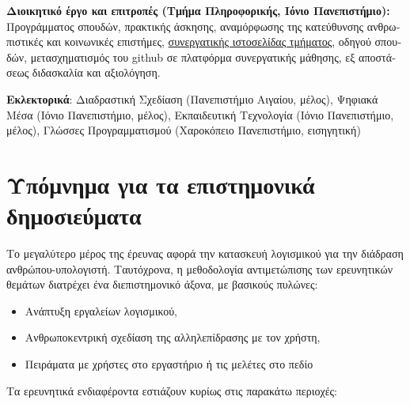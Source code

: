 \documentclass[11pt, a4paper]{article}
\begin{document}
\begin{greek}
\textbf{Διοικητικό έργο και επιτροπές (Τμήμα Πληροφορικής, Ιόνιο
Πανεπιστήμιο):} Προγράμματος σπουδών, πρακτικής άσκησης, αναμόρφωσης της
κατεύθυνσης ανθρωπιστικές και κοινωνικές επιστήμες,
\href{https://github.com/ioniodi/sitegr}{συνεργατικής ιστοσελίδας
τμήματος}, οδηγού σπουδών, μετασχηματισμός του github σε πλατφόρμα
συνεργατικής μάθησης, εξ αποστάσεως διδασκαλία και αξιολόγηση.

\textbf{Εκλεκτορικά}: Διαδραστική Σχεδίαση (Πανεπιστήμιο Αιγαίου,
μέλος), Ψηφιακά Μέσα (Ιόνιο Πανεπιστήμιο, μέλος), Εκπαιδευτική
Τεχνολογία (Ιόνιο Πανεπιστήμιο, μέλος), Γλώσσες Προγραμματισμού
(Χαροκόπειο Πανεπιστήμιο, εισηγητική)

\hypertarget{ux3c5ux3c0ux3ccux3bcux3bdux3b7ux3bcux3b1-ux3b3ux3b9ux3b1-ux3c4ux3b1-ux3b5ux3c0ux3b9ux3c3ux3c4ux3b7ux3bcux3bfux3bdux3b9ux3baux3ac-ux3b4ux3b7ux3bcux3bfux3c3ux3b9ux3b5ux3cdux3bcux3b1ux3c4ux3b1}{%
\section{Υπόμνημα για τα επιστημονικά
δημοσιεύματα}\label{ux3c5ux3c0ux3ccux3bcux3bdux3b7ux3bcux3b1-ux3b3ux3b9ux3b1-ux3c4ux3b1-ux3b5ux3c0ux3b9ux3c3ux3c4ux3b7ux3bcux3bfux3bdux3b9ux3baux3ac-ux3b4ux3b7ux3bcux3bfux3c3ux3b9ux3b5ux3cdux3bcux3b1ux3c4ux3b1}}

Το μεγαλύτερο μέρος της έρευνας αφορά την κατασκευή λογισμικού για την
διάδραση ανθρώπου-υπολογιστή. Ταυτόχρονα, η μεθοδολογία αντιμετώπισης
των ερευνητικών θεμάτων διατρέχει ένα διεπιστημονικό άξονα, με βασικούς
πυλώνες:

\begin{itemize}
\item
  Ανάπτυξη εργαλείων λογισμικού,
\item
  Ανθρωποκεντρική σχεδίαση της αλληλεπίδρασης με τον χρήστη,
\item
  Πειράματα με χρήστες στο εργαστήριο ή τις μελέτες στο πεδίο
\end{itemize}

Τα ερευνητικά ενδιαφέροντα εστιάζουν κυρίως στις παρακάτω περιοχές:


\end{greek}
\end{document}
